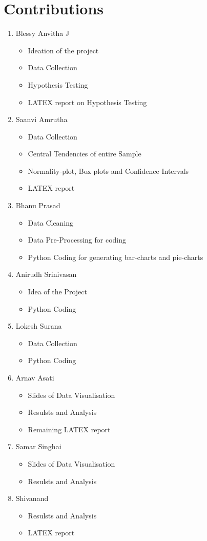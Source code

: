 \documentclass{article}
\begin{document}
\section{Contributions}
\begin{enumerate}
\item Blessy Anvitha J
\begin{itemize}
  \item Ideation of the project
  \item Data Collection
  \item Hypothesis Testing 
  \item LATEX report on Hypothesis Testing
\end{itemize}
\item Saanvi Amrutha
\begin{itemize}
  \item Data Collection
  \item Central Tendencies of entire Sample
  \item Normality-plot, Box plots and Confidence Intervals
  \item LATEX report
\end{itemize}
\item Bhanu Prasad
\begin{itemize}
  \item Data Cleaning
  \item Data Pre-Processing for coding
  \item Python Coding for generating bar-charts and pie-charts
\end{itemize}
\item Anirudh Srinivasan
\begin{itemize}
  \item Idea of the Project
  \item Python Coding
\end{itemize}
\item Lokesh Surana
\begin{itemize}
  \item Data Collection
  \item Python Coding
\end{itemize}

\item Arnav Asati
\begin{itemize}
  \item Slides of Data Visualisation
  \item Resulsts and Analysis
  \item Remaining LATEX report
\end{itemize}
\item Samar Singhai 
\begin{itemize}
  \item Slides of Data Visualisation
  \item Resulsts and Analysis
\end{itemize}
\item Shivanand
\begin{itemize}
  \item Resulsts and Analysis
  \item LATEX report
\end{itemize}
\end{enumerate}
\end{document}

